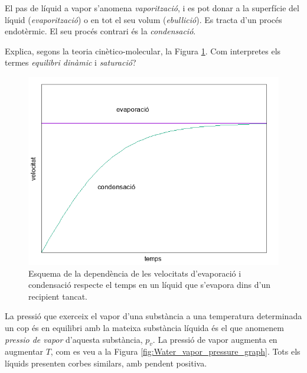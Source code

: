 El pas de líquid a vapor s'anomena \emph{vaporització}, i es pot donar a la superfície del líquid (\emph{evaporització}) o en tot el seu volum (\emph{ebullició}).
Es tracta d'un procés endotèrmic. El seu procés contrari és la \emph{condensació}.

\begin{exr}
Explica, segons la teoria cinètico-molecular, la Figura \ref{fig:evap_vs_condens}. Com interpretes els termes \emph{equilibri dinàmic} i \emph{saturació}?
\end{exr}
\begin{figure}[h]
\centering
\includegraphics[scale=0.6]{figures/evap_vs_condens.png}
\caption{Esquema de la dependència de les velocitats d'evaporació i condensació respecte el temps en un líquid que s'evapora dins d'un recipient tancat.}
\label{fig:evap_vs_condens}
\end{figure}

La pressió que exerceix el vapor d'una substància a una temperatura determinada un cop és en equilibri amb la mateixa substància líquida és el que anomenem \emph{pressio de vapor} d'aquesta substància, $p_v$. La pressió de vapor augmenta en augmentar $T$, com es veu a la Figura \ref{fig:Water_vapor_pressure_graph}. Tots els líquids presenten corbes similars, amb pendent positiva.

